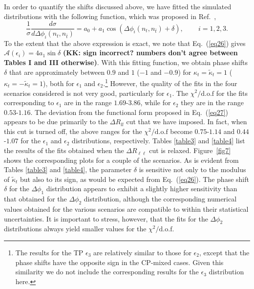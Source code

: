 \documentclass[aps,preprint,tightenlines,floatfix,superscriptaddress,nofootinbib,showpacs]{revtex4-1}
\def\beq{\begin{equation}}
\def\eeq{\end{equation}}
\def\tbar{\bar{t}}
\def\kp{\kappa_t}
\def\kpt{\tilde{\kappa}_t}
\begin{document}
In order to quantify the shifts discussed above, we have fitted
the simulated distributions with the following function, which was proposed in
Ref.~\cite{Ellis},
%
\beq
\label{eq27}
\frac{1}{\sigma}\frac{d\sigma}{d\Delta\phi_i(n_t,n_{\tbar})}=a_0 + a_1\cos(\Delta\phi_i(n_t,n_{\tbar})+\delta),\qquad\, i=1,2,3.
\eeq
%
To the extent that the above expression is exact, we note that
Eq.~(\ref{eq26}) 
gives $\mathcal{A}(\epsilon_i)=4a_1 \sin\delta$ {\bf (KK: sign
  incorrect? numbers don't agree between Tables I and III otherwise)}. With
this fitting function, we obtain phase shifts $\delta$ that
are approximately between
$0.9$ and $1$ ($-1$ and $-0.9$) for $\kp=\kpt=1$ ($\kp=-\kpt=1$), both
for $\epsilon_1$ and $\epsilon_2$.\footnote{The results for the
  TP $\epsilon_3$ are relatively similar to
  those for $\epsilon_2$, except that the phase shifts have the opposite
  sign in the $\mathrm{CP}$-mixed cases.  Given this similarity
  we do not include the corresponding results for the $\epsilon_3$ distribution
  here.}  However, the quality of the fits in the four scenarios considered is
not very good, particularly for $\epsilon_1$.  The
$\chi^2/\mathrm{d.o.f}$ for the fits corresponding to $\epsilon_1$ are in the range
$1.69$-$3.86$, while for $\epsilon_2$ they are in the range $0.53$-$1.16$.
The deviation from the functional
form proposed in Eq.~(\ref{eq27}) appears to be due primarily to the $\Delta
R_{ll}$ cut that we have imposed. In fact, when this cut is turned off, the
above ranges for the $\chi^2/\mathrm{d.o.f}$ become $0.75$-$1.14$ and
$0.44$-$1.07$ for the $\epsilon_1$ and $\epsilon_2$ distributions,
respectively. Tables \ref{table3} and \ref{table4} list the
results of the fits obtained when the $\Delta R_{\ell\ell}$ cut is
relaxed.  Figure~\ref{fig7} shows the corresponding
plots for a couple of the scenarios.
As is evident from Tables \ref{table3} and \ref{table4}, the
parameter $\delta$ is sensitive not only to the modulus of $\kpt$ but
also to its sign, as would be expected from Eq.~(\ref{eq26}).
The phase shift $\delta$ for the $\Delta\phi_1$ distribution
appears to exhibit a slightly higher sensitivity than
that obtained for the $\Delta\phi_2$ distribution, although the corresponding
numerical values obtained for the various scenarios are
compatible to within their statistical uncertainties. It is
important to stress, however, that the fits for the $\Delta\phi_2$ distributions
always yield smaller values for the $\chi^2/\mathrm{d.o.f}$.
\end{document}
